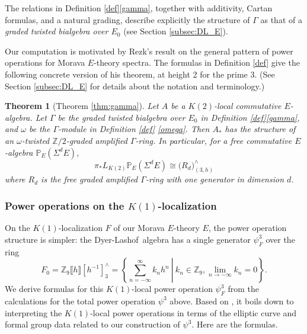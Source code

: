 \documentclass{gtpart}
\newtheorem{thm}{Theorem}
\theoremstyle{definition}
\theoremstyle{remark}
\newcommand{\mb}[1]{\mathbb{#1}}
\newcommand{\DL}{Dyer-Lashof~}
\newcommand{\BP}{{\mb P}}
\newcommand{\BZ}{{\mb Z}}
\newcommand{\G}{\Gamma}
\newcommand{\p}{\psi^3}
\numberwithin{equation}{section}
\numberwithin{thm}{section}
\begin{document}
The relations in Definition \ref{def}\thinspace \eqref{gamma}, together 
with additivity, Cartan formulas, and a natural grading, describe 
explicitly the structure of $\G$ as that of a {\em graded twisted 
bialgebra over $E_0$} (see Section \ref{subsec:DL_E}).  

Our computation is motivated by Rezk's result \cite{slides, cong} on the 
general pattern of power operations for Morava $E$-theory spectra.  The 
formulas in Definition \ref{def} give the following concrete version of 
his theorem, at height 2 for the prime 3.  (See Section 
\ref{subsec:DL_E} for details about the notation and terminology.)  

\begin{thm}[Theorem \ref{thm:gamma}]
 Let $A$ be a $K(2)$-local commutative $E$-algebra.  Let $\G$ be the 
 graded twisted bialgebra over $E_0$ in Definition 
 \ref{def}\thinspace \eqref{gamma}, and $\omega$ be the $\G$-module in 
 Definition \ref{def} \eqref{omega}.  Then $A_*$ has the structure of an 
 $\omega$-twisted $\BZ/2$-graded amplified $\G$-ring.  In particular, 
 for a free commutative $E$-algebra $\BP_E (\Sigma^d E)$, 
 \[
  \pi_* L_{K(2)} \BP_E (\Sigma^d E) \cong \big( R_d \big)_{(3,h)}^\wedge 
 \]
 where $R_d$ is the free graded amplified $\G$-ring with one generator 
 in dimension $d$.  
\end{thm}

\subsubsection*{Power operations on the $K(1)$-localization}

On the $K(1)$-localization $F$ of our Morava $E$-theory $E$, the power 
operation structure is simpler: the \DL algebra has a single generator 
$\p_F$ over the ring 
\[
 F_0 = \BZ_9 \llbracket h \rrbracket [h^{-1}]_3^\wedge = 
 \left.\left\{\sum_{n = -\infty}^{\infty} k_n h^n~\right|~k_n \in \BZ_9, 
 \lim_{n \to -\infty} k_n = 0\right\}.  
\]
We derive formulas for this $K(1)$-local power operation $\p_F$ from the 
calculations for the total power operation $\p$ above.  Based on 
\cite[Sections 2.4 and 8.2]{level3}, it boils down to interpreting the 
$K(1)$-local power operations in terms of the elliptic curve and formal 
group data related to our construction of $\p$.  Here are the formulas.  
\end{document}
